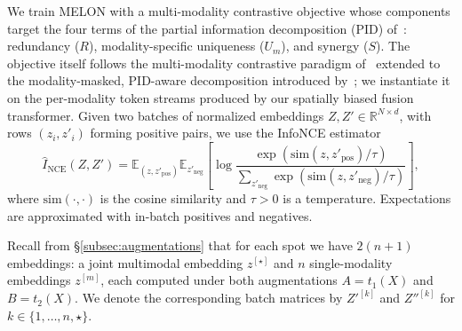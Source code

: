 \documentclass{article}
\theoremstyle{plain}
\theoremstyle{definition}
\begin{document}
We train MELON with a multi-modality contrastive objective whose components target the four terms of the partial information decomposition (PID) of~\citet{williams2010nonnegative,bertschinger2014quantifying}: redundancy ($R$), modality-specific uniqueness ($U_m$), and synergy ($S$). The objective itself follows the multi-modality contrastive paradigm of~\citet{tian2020contrastive} extended to the modality-masked, PID-aware decomposition introduced by~\citet{dufumier2024align}; we instantiate it on the per-modality token streams produced by our spatially biased fusion transformer. Given two batches of normalized embeddings $Z,Z' \in \mathbb{R}^{N\times d}$, with rows $(z_i,z'_i)$ forming positive pairs, we use the InfoNCE estimator~\cite{oord2018representation}
\begin{equation}
  \label{eq:infoNCE}
  \widehat{I}_{\mathrm{NCE}}(Z,Z')
  =
  \mathbb{E}_{(z,z'_{\mathrm{pos}})}
  \mathbb{E}_{z'_{\mathrm{neg}}}
  \left[
    \log
    \frac{\exp(\mathrm{sim}(z,z'_{\mathrm{pos}})/\tau)}
    {\sum_{z'_{\mathrm{neg}}}\exp(\mathrm{sim}(z,z'_{\mathrm{neg}})/\tau)}
  \right],
\end{equation}
where $\mathrm{sim}(\cdot,\cdot)$ is the cosine similarity and $\tau>0$ is a temperature. Expectations are approximated with in-batch positives and negatives.

Recall from \S\ref{subsec:augmentations} that for each spot we have $2(n+1)$ embeddings: a joint multimodal embedding $z^{[\star]}$ and $n$ single-modality embeddings $z^{[m]}$, each computed under both augmentations $A = t_1(X)$ and $B = t_2(X)$. We denote the corresponding batch matrices by $Z'^{[k]}$ and $Z''^{[k]}$ for $k \in \{1, \ldots, n, \star\}$.
\end{document}
